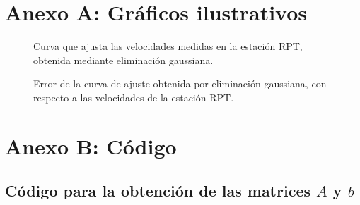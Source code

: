\documentclass[%
	final,
	reprint,
	notitlepage,
	narroweqnarray,
	inline,
	twoside,
	invited
	]{ieee}
\begin{document}


\clearpage

\onecolumn

\onecolumn
\section*{Anexo A: Gráficos ilustrativos}

\begin{figure}[H]
\centering
\caption{Curva que ajusta las velocidades medidas en la estación RPT, obtenida mediante eliminación gaussiana.}
\label{dataRPT}
\end{figure}

\begin{figure}[H]
\centering
\caption{Error de la curva de ajuste obtenida por eliminación gaussiana, con respecto a las velocidades de la estación RPT.}
\label{dataRPT}
\end{figure}

\clearpage



\section*{Anexo B: Código}

\subsection{Código para la obtención de las matrices $A$ y $b$}

\end{document}
